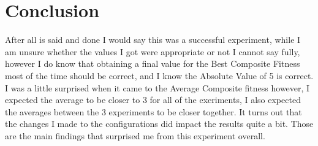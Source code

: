 \documentclass[•]{article}
\begin{document}
\section{Conclusion}
\indent \indent After all is said and done I would say this was a successful experiment, while I am unsure whether the values I got were appropriate or not I cannot say fully, however I do know that obtaining a final value for the Best Composite Fitness most of the time should be correct, and I know the Absolute Value of 5 is correct.  I was a little surprised when it came to the Average Composite fitness however, I expected the average to be closer to 3 for all of the exeriments, I also expected the averages between the 3 experiments to be closer together.  It turns out that the changes I made to the configurations did impact the results quite a bit.  Those are the main findings that surprised me from this experiment overall.
\end{document}
